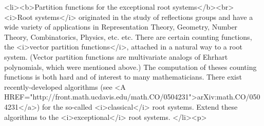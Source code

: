 <li><b>Partition functions for the exceptional root systems</b><br>
<i>Root systems</i> originated in the study of reflections groups and have a wide variety of applications in Representation Theory, Geometry, Number Theory, Combinatorics, Physics, etc. etc. There are certain counting functions, the <i>vector partition functions</i>, attached in a natural way to a root system. (Vector partition functions are multivariate analogs of Ehrhart polynomials, which were mentioned above.) The computation of theses counting functions is both hard and of interest to many mathematicians. There exist recently-developed algorithms (see <A HREF="http://front.math.ucdavis.edu/math.CO/0504231">arXiv:math.CO/0504231</a>) for the so-called <i>classical</i> root systems. Extend these algorithms to the <i>exceptional</i> root systems.
</li><p>

